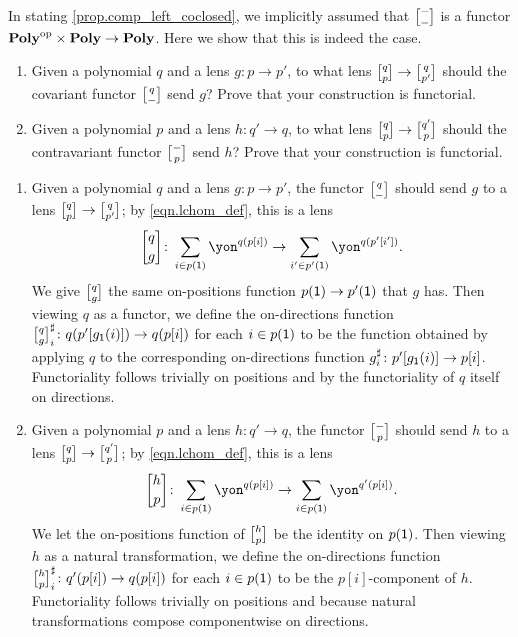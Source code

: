 \documentclass[Book-Poly]{subfiles}
\begin{document}
\begin{exercise} \label{exc.lchom_func}
In stating \cref{prop.comp_left_coclosed}, we implicitly assumed that $\lchom{-}{-}$ is a functor $\mathbf{Poly}^{\textnormal{op}}\times\mathbf{Poly}\to\mathbf{Poly}$.
Here we show that this is indeed the case.
\begin{enumerate}
    \item Given a polynomial $q$ and a lens $g\colon p\to p'$, to what lens $\lchom{q}{p}\to\lchom{q}{p'}$ should the covariant functor $\lchom{q}{-}$ send $g$?
    Prove that your construction is functorial.
    
    \item Given a polynomial $p$ and a lens $h\colon q'\to q$, to what lens $\lchom{q}{p}\to\lchom{q'}{p}$ should the contravariant functor $\lchom{-}{p}$ send $h$?
    Prove that your construction is functorial.
    \qedhere
\end{enumerate}
\begin{solution}
\begin{enumerate}
    \item Given a polynomial $q$ and a lens $g\colon p\to p'$, the functor $\lchom{q}{-}$ should send $g$ to a lens $\lchom{q}{p}\to\lchom{q}{p'}$; by \eqref{eqn.lchom_def}, this is a lens
    \[
        \lchom{q}{g}\colon\sum_{i\in p(\1)}\yon^{q(p[i])}\to\sum_{i'\in p'(\1)}\yon^{q(p'[i'])}.
    \]
    We give $\lchom{q}{g}$ the same on-positions function $p(\textsf{1})\to p'(\textsf{1})$ that $g$ has.
    Then viewing $q$ as a functor, we define the on-directions function $\lchom{q}{g}^\sharp_i\colon q(p'[g_\1(i)])\to q(p[i])$ for each $i\in p(\textsf{1})$ to be the function obtained by applying $q$ to the corresponding on-directions function $g^\sharp_i\colon p'[g_{\textsf{1}}(i)]\to p[i]$.
    Functoriality follows trivially on positions and by the functoriality of $q$ itself on directions.

    \item Given a polynomial $p$ and a lens $h\colon q'\to q$, the functor $\lchom{-}{p}$ should send $h$ to a lens $\lchom{q}{p}\to\lchom{q'}{p}$; by \eqref{eqn.lchom_def}, this is a lens
    \[
        \lchom{h}{p}\colon\sum_{i\in p(\1)}\yon^{q(p[i])}\to\sum_{i\in p(\1)}\yon^{q'(p[i])}.
    \]
    We let the on-positions function of $\lchom{h}{p}$ be the identity on $p(\textsf{1})$.
    Then viewing $h$ as a natural transformation, we define the on-directions function $\lchom{h}{p}^\sharp_i\colon q'(p[i])\to q(p[i])$ for each $i\in p(\textsf{1})$ to be the $p[i]$-component of $h$.
    Functoriality follows trivially on positions and because natural transformations compose componentwise on directions.
\end{enumerate}
\end{solution}
\end{exercise}
\end{document}
